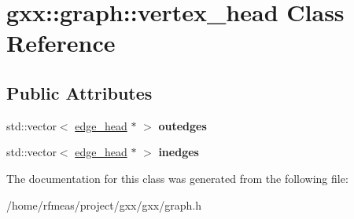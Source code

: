 \hypertarget{classgxx_1_1graph_1_1vertex__head}{}\section{gxx\+:\+:graph\+:\+:vertex\+\_\+head Class Reference}
\label{classgxx_1_1graph_1_1vertex__head}
\subsection*{Public Attributes}
\begin{DoxyCompactItemize}
\item 
std\+::vector$<$ \hyperlink{classgxx_1_1graph_1_1edge__head}{edge\+\_\+head} $\ast$ $>$ {\bfseries outedges}\hypertarget{classgxx_1_1graph_1_1vertex__head_adc373d04409383e28b9ffec166a41a0f}{}\label{classgxx_1_1graph_1_1vertex__head_adc373d04409383e28b9ffec166a41a0f}

\item 
std\+::vector$<$ \hyperlink{classgxx_1_1graph_1_1edge__head}{edge\+\_\+head} $\ast$ $>$ {\bfseries inedges}\hypertarget{classgxx_1_1graph_1_1vertex__head_a25c6d01bc78a2229f02768a01cf846d9}{}\label{classgxx_1_1graph_1_1vertex__head_a25c6d01bc78a2229f02768a01cf846d9}

\end{DoxyCompactItemize}


The documentation for this class was generated from the following file\+:\begin{DoxyCompactItemize}
\item 
/home/rfmeas/project/gxx/gxx/graph.\+h\end{DoxyCompactItemize}
